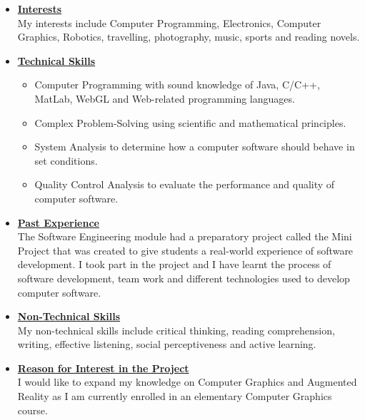 \documentclass[a4paper,12pt]{article}
\begin{document}
\begin{itemize}
\item {\large \underline{\textbf{Interests}}}\\[0.2cm]
My interests include Computer Programming, Electronics, Computer Graphics, Robotics, travelling, photography, music, sports and reading novels.
\\
\item {\large \underline{\textbf{Technical Skills}}}

	\begin{itemize}
		\item Computer Programming with sound knowledge of Java, C/C++, MatLab, WebGL and Web-related 					programming languages.
		\item Complex Problem-Solving using scientific and mathematical principles.
		\item System Analysis to determine how a computer software should behave in set conditions.
		\item Quality Control Analysis to evaluate the performance and quality of computer software.
	\end{itemize}
\bigskip
\item {\large \underline{\textbf{Past Experience}}}\\[0.2cm]
The Software Engineering module had a preparatory project called the Mini Project that was created to give students a real-world experience of software development. I took part in the project and I have learnt the process of software development, team work and different technologies used to develop computer software. 
\\
\item {\large \underline{\textbf{Non-Technical Skills}}}\\[0.2cm]
My non-technical skills include critical thinking, reading comprehension, writing, effective listening, social perceptiveness and active learning. 
\\
\item {\large \underline{\textbf{Reason for Interest in the Project}}}\\[0.2cm]
I would like to expand my knowledge on Computer Graphics and Augmented Reality as I am currently enrolled in an elementary Computer Graphics course.

\end{itemize}

\newpage
\end{document}
